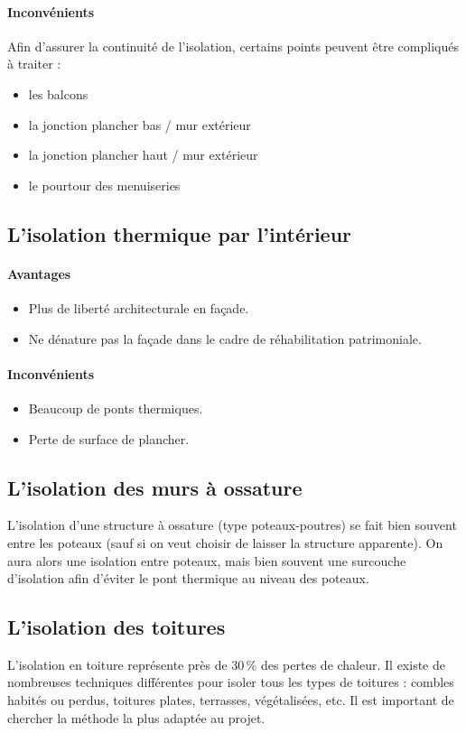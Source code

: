 \paragraph{Inconvénients}
Afin d'assurer la continuité de l'isolation, certains points peuvent être compliqués à traiter :
\begin{itemize}
  \item les balcons
  \item la jonction plancher bas / mur extérieur
  \item la jonction plancher haut / mur extérieur
  \item le pourtour des menuiseries
\end{itemize}

\subsection*{L'isolation thermique par l'intérieur}
\paragraph{Avantages}
\begin{itemize}
  \item Plus de liberté architecturale en façade.
  \item Ne dénature pas la façade dans le cadre de réhabilitation patrimoniale.
\end{itemize}

\paragraph{Inconvénients}
\begin{itemize}
  \item Beaucoup de ponts thermiques.
  \item Perte de surface de plancher.
\end{itemize}


\subsection*{L'isolation des murs à ossature}
L'isolation d'une structure à ossature (type poteaux-poutres) se fait bien souvent entre les poteaux (sauf si on veut choisir de laisser la structure apparente). On aura alors une isolation entre poteaux, mais bien souvent une surcouche d'isolation afin d'éviter le pont thermique au niveau des poteaux.


\subsection*{L'isolation des toitures}
L'isolation en toiture représente près de 30\,\% des pertes de chaleur. Il existe de nombreuses  techniques différentes pour isoler tous les types de toitures : combles habités ou perdus, toitures plates, terrasses, végétalisées, etc. Il est important de chercher la méthode la plus adaptée au projet.

